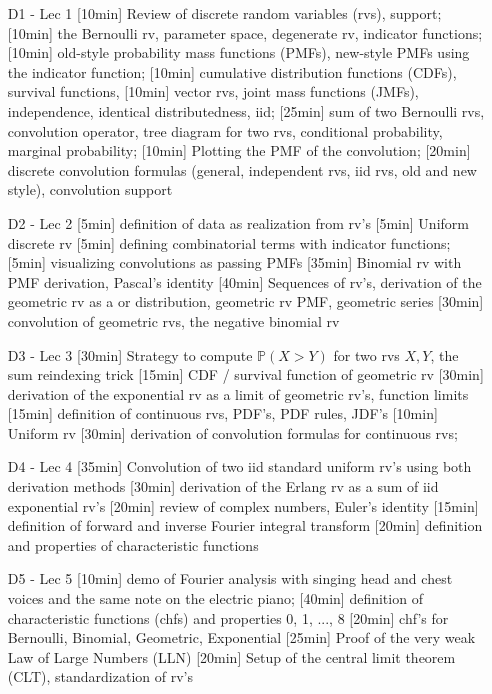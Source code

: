 \begin{enumerate}
\item[D1 - Lec 1] [10min] Review of discrete random variables (rvs), support; [10min] the Bernoulli rv, parameter space, degenerate rv, indicator functions; [10min] old-style probability mass functions (PMFs), new-style PMFs using the indicator function; [10min] cumulative distribution functions (CDFs), survival functions, [10min] vector rvs, joint mass functions (JMFs), independence, identical distributedness, iid; [25min] sum of two Bernoulli rvs, convolution operator, tree diagram for two rvs, conditional probability, marginal probability; [10min] Plotting the PMF of the convolution; [20min] discrete convolution formulas (general, independent rvs, iid rvs, old and new style), convolution support

\item[D2 - Lec 2] [5min] definition of data as realization from rv's [5min] Uniform discrete rv  [5min] defining combinatorial terms with indicator functions; [5min] visualizing convolutions as passing PMFs  [35min] Binomial rv with PMF derivation, Pascal's identity [40min] Sequences of rv's, derivation of the geometric rv as a  or  distribution, geometric rv PMF, geometric series [30min] convolution of geometric rvs, the negative binomial rv

\item[D3 - Lec 3] [30min] Strategy to compute $\mathbb{P}(X > Y)$ for two rvs $X, Y$, the sum reindexing trick [15min] CDF / survival function of geometric rv [30min] derivation of the exponential rv as a limit of geometric rv's, function limits [15min] definition of continuous rvs, PDF's, PDF rules, JDF's [10min] Uniform rv [30min] derivation of convolution formulas for continuous rvs;

\item[D4 - Lec 4] [35min] Convolution of two iid standard uniform rv's using both derivation methods [30min] derivation of the Erlang rv as a sum of iid exponential rv's [20min] review of complex numbers, Euler's identity  [15min] definition of forward and inverse Fourier integral transform [20min] definition and properties of characteristic functions  
 
\item[D5 - Lec 5] [10min] demo of Fourier analysis with singing head and chest voices and the same note on the electric piano; [40min] definition of characteristic functions (chfs) and properties 0, 1, ..., 8 [20min] chf's for Bernoulli, Binomial, Geometric, Exponential [25min] Proof of the very weak Law of Large Numbers (LLN) [20min] Setup of the central limit theorem (CLT), standardization of rv's


\end{enumerate}
